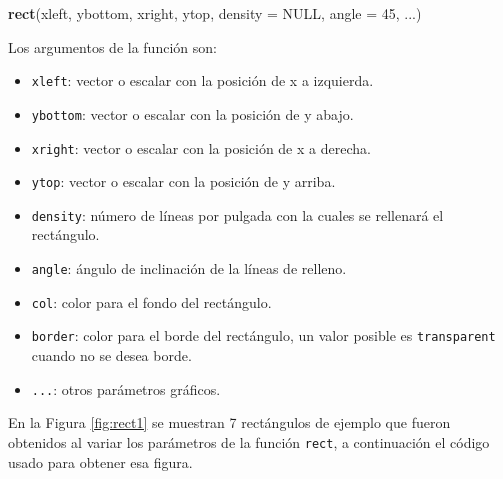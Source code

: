 \documentclass[10pt,]{krantz}
\makeatletter
\newenvironment{Shaded}{\begin{snugshade}}{\end{snugshade}}
\newcommand{\KeywordTok}[1]{\textcolor[rgb]{0.13,0.29,0.53}{\textbf{{#1}}}}
\newcommand{\DataTypeTok}[1]{\textcolor[rgb]{0.13,0.29,0.53}{{#1}}}
\newcommand{\DecValTok}[1]{\textcolor[rgb]{0.00,0.00,0.81}{{#1}}}
\newcommand{\OtherTok}[1]{\textcolor[rgb]{0.56,0.35,0.01}{{#1}}}
\newcommand{\NormalTok}[1]{{#1}}
\providecommand{\tightlist}{%
  \setlength{\itemsep}{0pt}\setlength{\parskip}{0pt}}
\newenvironment{kframe}{%
\medskip{}
\setlength{\fboxsep}{.8em}
 \def\at@end@of@kframe{}%
 \ifinner\ifhmode%
  \def\at@end@of@kframe{\end{minipage}}%
  \begin{minipage}{\columnwidth}%
 \fi\fi%
 \def\FrameCommand##1{\hskip\@totalleftmargin \hskip-\fboxsep
 \colorbox{shadecolor}{##1}\hskip-\fboxsep
     \hskip-\linewidth \hskip-\@totalleftmargin \hskip\columnwidth}%
 \MakeFramed {\advance\hsize-\width
   \@totalleftmargin\z@ \linewidth\hsize
   \@setminipage}}%
 {\par\unskip\endMakeFramed%
 \at@end@of@kframe}
\renewenvironment{Shaded}{\begin{kframe}}{\end{kframe}}
\makeatother
\begin{document}
\begin{Shaded}
\begin{Highlighting}[]
\KeywordTok{rect}\NormalTok{(xleft, ybottom, xright, ytop,}
     \DataTypeTok{density =} \OtherTok{NULL}\NormalTok{, }\DataTypeTok{angle =} \DecValTok{45}\NormalTok{, ...)}
\end{Highlighting}
\end{Shaded}

Los argumentos de la función son:

\begin{itemize}
\tightlist
\item
  \texttt{xleft}: vector o escalar con la posición de x a izquierda.
\item
  \texttt{ybottom}: vector o escalar con la posición de y abajo.
\item
  \texttt{xright}: vector o escalar con la posición de x a derecha.
\item
  \texttt{ytop}: vector o escalar con la posición de y arriba.
\item
  \texttt{density}: número de líneas por pulgada con la cuales se
  rellenará el rectángulo.
\item
  \texttt{angle}: ángulo de inclinación de la líneas de relleno.
\item
  \texttt{col}: color para el fondo del rectángulo.
\item
  \texttt{border}: color para el borde del rectángulo, un valor posible
  es \texttt{\textquotesingle{}transparent\textquotesingle{}} cuando no
  se desea borde.
\item
  \texttt{...}: otros parámetros gráficos.
\end{itemize}

En la Figura \ref{fig:rect1} se muestran 7 rectángulos de ejemplo que
fueron obtenidos al variar los parámetros de la función \texttt{rect}, a
continuación el código usado para obtener esa figura.
\end{document}
